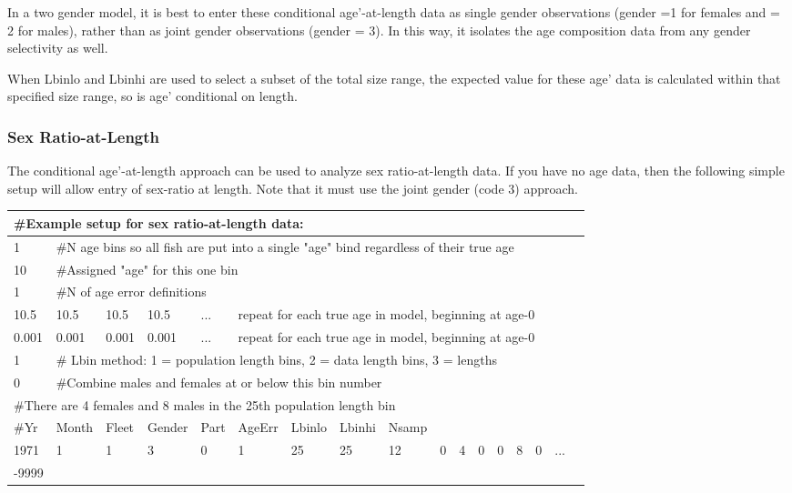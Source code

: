 In a two gender model, it is best to enter these conditional age’-at-length data as single gender observations (gender =1 for females and = 2 for males), rather than as joint gender observations (gender = 3).  In this way, it isolates the age composition data from any gender selectivity as well.

When Lbin\textunderscore lo and Lbin\textunderscore hi are used to select a subset of the total size range, the expected value for these age’ data is calculated within that specified size range, so is age’ conditional on length.

\subsubsection{Sex Ratio-at-Length}
The conditional age’-at-length approach can be used to analyze sex ratio-at-length data.  If you have no age data, then the following simple setup will allow entry of sex-ratio at length.  Note that it must use the joint gender (code 3) approach.

\begin{center}
	\begin{tabular}{p{1cm} p{1cm} p{1cm} p{1cm} p{1cm} p{1cm} p{1cm} p{1cm} p{1cm} p{0.2cm} p{0.2cm} p{.2cm} p{.2cm} p{.2cm} p{.2cm} p{.2cm} p{0.2cm} }
		\multicolumn{17}{l}{\#Example setup for sex ratio-at-length data:}\\
		\hline
		1 & \multicolumn{16}{l}{\#N age bins so all fish are put into a single "age" bind regardless of their true age}\\
		\hline
		10 & \multicolumn{16}{l}{\#Assigned "age" for this one bin}\\
		\hline
		1  & \multicolumn{16}{l}{\#N of age error definitions}\\
		\hline
		10.5 & 10.5 & 10.5 & 10.5 & ... & \multicolumn{12}{l}{repeat for each true age in model, beginning at age-0}\\
		0.001 & 0.001 & 0.001 & 0.001 & ... & \multicolumn{12}{l}{repeat for each true age in model, beginning at age-0}\\
		\hline
		1 & \multicolumn{16}{l}{\# Lbin method: 1 = population length bins, 2 = data length bins, 3 = lengths}\\
		\hline
		0 & \multicolumn{16}{l}{\#Combine males and females at or below this bin number}\\
		\hline
		\multicolumn{17}{l}{\#There are 4 females and 8 males in the 25th population length bin}\\
		\hline
		\#Yr & Month & Fleet & Gender & Part & AgeErr & Lbinlo & Lbinhi & Nsamp & & & & & & & \\
		\hline
		1971 & 1 & 1 & 3 & 0 & 1 & 25 & 25 & 12 & 0 & 4 & 0 & 0 & 8 & 0 & ...\\
		-9999  & \multicolumn{16}{l}{}\\
		\hline
	\end{tabular}
\end{center}

